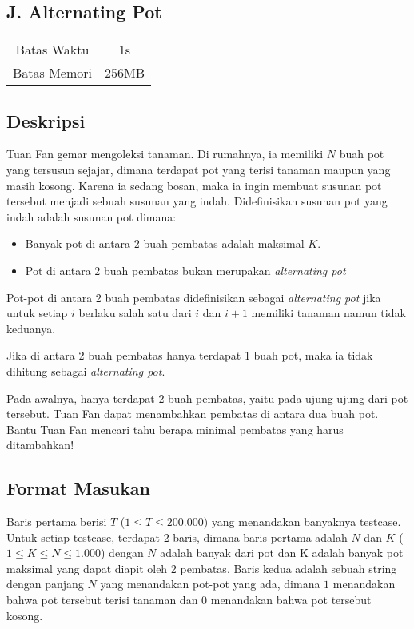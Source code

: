 \documentclass{article}
\begin{document}
\begin{center}
    \section*{J. Alternating Pot}

    \begin{tabular}{ | c c | }
        \hline
        Batas Waktu  & 1s \\  
        Batas Memori & 256MB \\
        \hline
    \end{tabular}
\end{center}

\subsection*{Deskripsi}

Tuan Fan gemar mengoleksi tanaman.
Di rumahnya, ia memiliki $N$ buah pot yang tersusun sejajar, dimana terdapat pot yang terisi tanaman maupun yang masih kosong.
Karena ia sedang bosan, maka ia ingin membuat susunan pot tersebut menjadi sebuah susunan yang indah.
Didefinisikan susunan pot yang indah adalah susunan pot dimana:

\begin{itemize}
    \setlength\itemsep{0pt}
    \item Banyak pot di antara 2 buah pembatas adalah maksimal $K$.
    \item Pot di antara 2 buah pembatas bukan merupakan \textit{alternating pot}
\end{itemize}

Pot-pot di antara 2 buah pembatas didefinisikan sebagai \textit{alternating pot} jika untuk setiap $i$ berlaku salah satu dari $i$ dan $i+1$ memiliki tanaman namun tidak keduanya.

Jika di antara 2 buah pembatas hanya terdapat 1 buah pot, maka ia tidak dihitung sebagai \textit{alternating pot}.

Pada awalnya, hanya terdapat 2 buah pembatas, yaitu pada ujung-ujung dari pot tersebut.
Tuan Fan dapat menambahkan pembatas di antara dua buah pot.
Bantu Tuan Fan mencari tahu berapa minimal pembatas yang harus ditambahkan!

\subsection*{Format Masukan}

Baris pertama berisi $T$ ($1 \leq T \leq 200.000$) yang menandakan banyaknya testcase.
Untuk setiap testcase, terdapat 2 baris, dimana baris pertama adalah $N$ dan $K$ ($1 \leq K \leq N \leq 1.000$) dengan $N$ adalah banyak dari pot dan K adalah banyak pot maksimal yang dapat diapit oleh 2 pembatas.
Baris kedua adalah sebuah string dengan panjang $N$ yang menandakan pot-pot yang ada, dimana $1$ menandakan bahwa pot tersebut terisi tanaman dan $0$ menandakan bahwa pot tersebut kosong.
\end{document}
